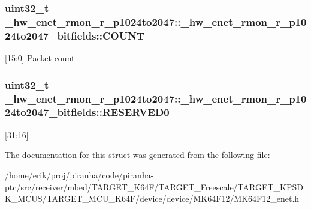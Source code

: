 \subsubsection[{\texorpdfstring{C\+O\+U\+NT}{COUNT}}]{\setlength{\rightskip}{0pt plus 5cm}uint32\+\_\+t \+\_\+hw\+\_\+enet\+\_\+rmon\+\_\+r\+\_\+p1024to2047\+::\+\_\+hw\+\_\+enet\+\_\+rmon\+\_\+r\+\_\+p1024to2047\+\_\+bitfields\+::\+C\+O\+U\+NT}\hypertarget{struct__hw__enet__rmon__r__p1024to2047_1_1__hw__enet__rmon__r__p1024to2047__bitfields_ae14d849232f2a9f43dde84cafd67cee8}{}\label{struct__hw__enet__rmon__r__p1024to2047_1_1__hw__enet__rmon__r__p1024to2047__bitfields_ae14d849232f2a9f43dde84cafd67cee8}
\mbox{[}15\+:0\mbox{]} Packet count 
\subsubsection[{\texorpdfstring{R\+E\+S\+E\+R\+V\+E\+D0}{RESERVED0}}]{\setlength{\rightskip}{0pt plus 5cm}uint32\+\_\+t \+\_\+hw\+\_\+enet\+\_\+rmon\+\_\+r\+\_\+p1024to2047\+::\+\_\+hw\+\_\+enet\+\_\+rmon\+\_\+r\+\_\+p1024to2047\+\_\+bitfields\+::\+R\+E\+S\+E\+R\+V\+E\+D0}\hypertarget{struct__hw__enet__rmon__r__p1024to2047_1_1__hw__enet__rmon__r__p1024to2047__bitfields_a509db5e39f4fbc24043d56bde274072b}{}\label{struct__hw__enet__rmon__r__p1024to2047_1_1__hw__enet__rmon__r__p1024to2047__bitfields_a509db5e39f4fbc24043d56bde274072b}
\mbox{[}31\+:16\mbox{]} 

The documentation for this struct was generated from the following file\+:\begin{DoxyCompactItemize}
\item 
/home/erik/proj/piranha/code/piranha-\/ptc/src/receiver/mbed/\+T\+A\+R\+G\+E\+T\+\_\+\+K64\+F/\+T\+A\+R\+G\+E\+T\+\_\+\+Freescale/\+T\+A\+R\+G\+E\+T\+\_\+\+K\+P\+S\+D\+K\+\_\+\+M\+C\+U\+S/\+T\+A\+R\+G\+E\+T\+\_\+\+M\+C\+U\+\_\+\+K64\+F/device/device/\+M\+K64\+F12/M\+K64\+F12\+\_\+enet.\+h\end{DoxyCompactItemize}
